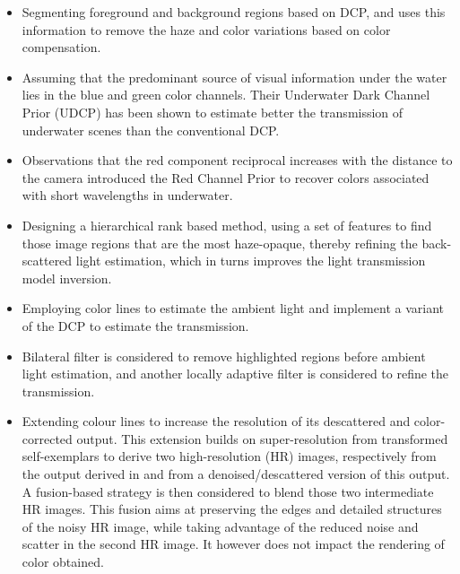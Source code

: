 \documentclass[hidelinks, 12pt]{report}
\begin{document}
\begin{itemize}
\item{Segmenting foreground and background regions based on DCP, and uses this information to remove the haze and color variations based on color compensation.}
\item{Assuming that the predominant source of visual information under the water lies in the blue and green color channels. Their Underwater Dark Channel Prior (UDCP) has been shown to estimate better the transmission of underwater scenes than the conventional DCP.}
\item{Observations that the red component reciprocal increases with the distance to the camera introduced the Red Channel Prior to recover colors associated with short wavelengths in underwater.}
\item{Designing a hierarchical rank based method, using a set of features to find those image regions that are the most haze-opaque, thereby refining the back-scattered light estimation, which in turns improves the light transmission model inversion.}
\item{Employing color lines to estimate the ambient light and implement a variant of the DCP to estimate the transmission.}
\item{Bilateral filter is considered to remove highlighted regions before ambient light estimation, and another locally adaptive filter is considered to refine the transmission.}
\item{Extending colour lines to increase the resolution of its descattered and color-corrected output. This extension builds on super-resolution from transformed self-exemplars to derive two high-resolution (HR) images, respectively from the output derived in and from a denoised/descattered version of this output. A fusion-based strategy is then considered to blend those two intermediate HR images. This fusion aims at preserving the edges and detailed structures of the noisy HR image, while taking advantage of the reduced noise and scatter in the second HR image. It however does not impact the rendering of color obtained.}
\end{itemize}
\end{document}

